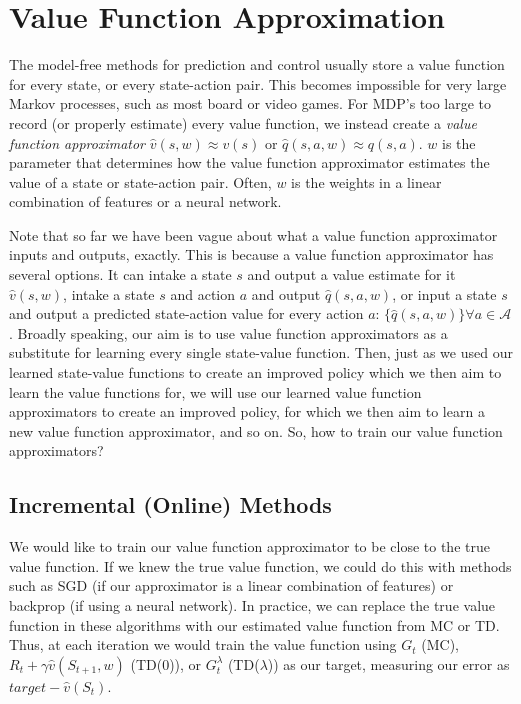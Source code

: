 \documentclass{article}
\newcommand{\ita}{\textit}
\begin{document}
\section{Value Function Approximation}

The model-free methods for prediction and control usually store a value function for every state, or every state-action pair. This becomes impossible for very large Markov processes, such as most board or video games. For MDP's too large to record (or properly estimate) every value function, we instead create a \ita{value function approximator} $\hat{v}(s, w)\approx v(s)$ or $\hat{q}(s, a, w) \approx q(s, a)$. $w$ is the parameter that determines how the value function approximator estimates the value of a state or state-action pair. Often, $w$ is the weights in a linear combination of features or a neural network.

Note that so far we have been vague about what a value function approximator inputs and outputs, exactly. This is because a value function approximator has several options. It can intake a state $s$ and output a value estimate for it $\hat{v}(s, w)$, intake a state $s$ and action $a$ and output $\hat{q}(s, a, w)$, or input a state $s$ and output a predicted state-action value for every action $a$: $\big\{\hat{q}(s, a, w)\big\}\forall a\in\mathcal{A}$. Broadly speaking, our aim is to use value function approximators as a substitute for learning every single state-value function. Then, just as we used our learned state-value functions to create an improved policy which we then aim to learn the value functions for, we will use our learned value function approximators to create an improved policy, for which we then aim to learn a new value function approximator, and so on. So, how to train our value function approximators?

\subsection{Incremental (Online) Methods}

We would like to train our value function approximator to be close to the true value function. If we knew the true value function, we could do this with methods such as SGD (if our approximator is a linear combination of features) or backprop (if using a neural network). In practice, we can replace the true value function in these algorithms with our estimated value function from MC or TD. Thus, at each iteration we would train the value function using $G_t$ (MC), $R_t + \gamma\hat{v}(S_{t+1}, w)$ (TD(0)), or $G^\lambda_t$ (TD($\lambda$)) as our target, measuring our error as $target - \hat{v}(S_t)$.
\end{document}
